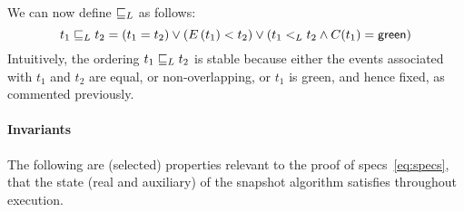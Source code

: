 
\noindent
%
We can now define $\mathrel{\sqsubseteq_L}$ as follows:
\begin{equation}
 t_1 \mathrel{\sqsubseteq_L} t_2  = (t_1 = t_2) \vee (E\,(t_1) < t_2) \vee
 (t_1\mathrel{<_L} t_2 \wedge C(t_1) = \mathsf{green}) \label{def-jleq}
\end{equation}
Intuitively, the ordering $t_1 \mathrel{\sqsubseteq_L} t_2$ is stable because either the
events associated with $t_1$ and $t_2$ are equal, or non-overlapping,
or $t_1$ is green, and hence fixed, as commented previously.


\paragraph{Invariants}%
The following are (selected) properties relevant to the proof of
specs~\eqref{eq:specs}, that the state (real and auxiliary) of the snapshot
algorithm satisfies throughout execution.  
